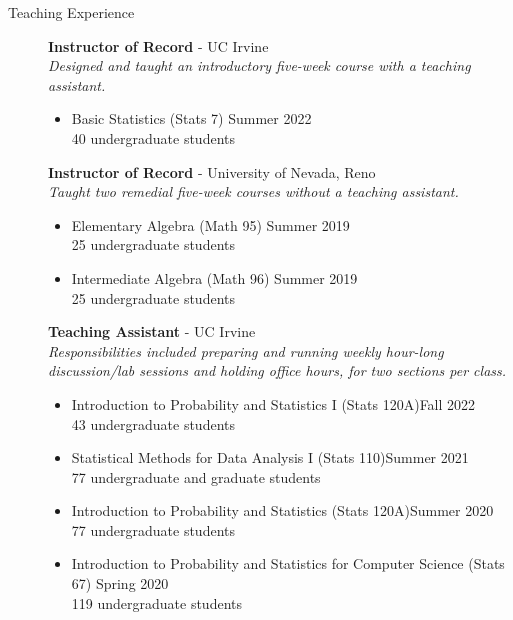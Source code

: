\documentclass{article}
\begin{document}
	\begin{description}
		\vspace{-2mm}
		\item[Teaching Experience]\hspace*{.1in} 
		
		\textbf{Instructor of Record} - UC Irvine\\
		\textit{Designed and taught an introductory five-week course with a teaching assistant.}
		\begin{itemize}
			\item Basic Statistics (Stats 7) \hfill{Summer 2022}\\
			40 undergraduate students
		\end{itemize}
		
		\textbf{Instructor of Record} - University of Nevada, Reno\\
		\textit{Taught two remedial five-week courses without a teaching assistant.}
		\begin{itemize}
			\item Elementary Algebra (Math 95) \hfill{Summer 2019}\\
			25 undergraduate students
			
			\item Intermediate Algebra (Math 96) \hfill{Summer 2019}\\
			25 undergraduate students
		\end{itemize}			
		
		\textbf{Teaching Assistant} - UC Irvine\\
		\textit{Responsibilities included preparing and running weekly hour-long discussion/lab sessions and holding office hours, for two sections per class.}
		\begin{itemize}
			\item Introduction to Probability and Statistics I (Stats 120A)\hfill{Fall 2022}\\
			43 undergraduate students
			
			\item Statistical Methods for Data Analysis I (Stats 110)\hfill{Summer 2021}\\
			77 undergraduate and graduate students %
			
			\item Introduction to Probability and Statistics (Stats 120A)\hfill{Summer 2020}\\
			77 undergraduate students %
			
			\item Introduction to Probability and Statistics for Computer Science (Stats 67) \hfill{Spring 2020}\\
			119 undergraduate students %
			

\end{itemize}
\end{description}
\end{document}
